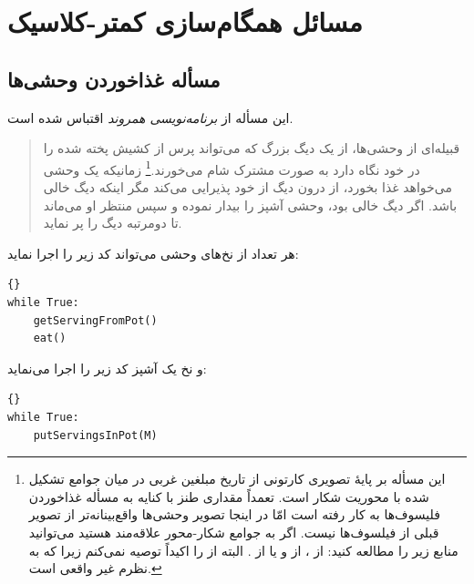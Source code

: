 \documentclass{book}
\newcommand{\clearemptydoublepage}{\newpage\cleardoublepage}
\begin{document}
\clearemptydoublepage
\chapter{مسائل همگام‌سازی کمتر-کلاسیک}
\label{next}


\section{مسأله غذاخوردن وحشی‌ها}

    این مسأله از  \emph{برنامه‌نویسی همروند}   اقتباس شده است\cite{andrews}. 

\begin {quotation}
    قبیله‌ای از وحشی‌ها، از یک دیگ بزرگ که می‌تواند   
    پرس از کشیش پخته شده را در خود نگاه دارد به صورت مشترک شام می‌خورند.\footnote{%
    این مسأله بر پایهٔ تصویری کارتونی از تاریخ مبلغین غربی در میان جوامع تشکیل شده با محوریت شکار است. 
    تعمداً مقداری طنز با کنایه به مسأله غذاخوردن فلیسوف‌ها به کار رفته است 
    امّا در اینجا تصویر وحشی‌ها واقع‌بینانه‌تر از تصویر قبلی از فیلسوف‌ها نیست. 
    اگر به جوامع شکار-محور علاقه‌مند هستید می‌توانید منابع زیر را مطالعه کنید:
     از ،
     از  و یا 
     از .
    البته  از  را اکیداً توصیه نمی‌کنم زیرا که به نظرم غیر واقعی است.}
    زمانیکه یک وحشی می‌خواهد غذا بخورد، از درون دیگ از خود پذیرایی می‌کند مگر اینکه دیگ خالی باشد. 
    اگر دیگ خالی بود، وحشی آشپز را بیدار نموده و سپس منتظر او می‌ماند تا دومرتبه دیگ را پر نماید.
\end{quotation}

    هر تعداد از نخ‌های وحشی می‌تواند کد زیر را اجرا نماید:

\begin{latin}
\begin{lstlisting}[title=\rl{کد ناهمگام یک وحشی}]{}
while True:
    getServingFromPot()
    eat()
\end{lstlisting}
\end{latin}

    و نخ یک آشپز کد زیر را اجرا می‌نماید:

\begin{latin}
\begin{lstlisting}[title=\rl{کد ناهمگام آشپز}]{}
while True:
    putServingsInPot(M)
\end{lstlisting}
\end{latin}
\end{document}
